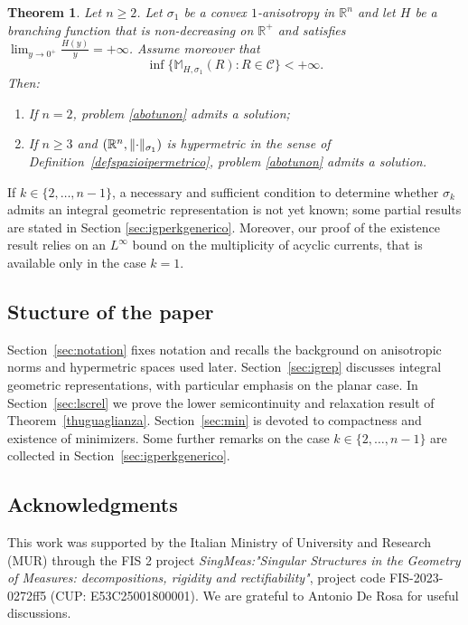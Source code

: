 \documentclass{article}
\numberwithin{equation}{section}
\theoremstyle{plain}%
\newtheorem{theorem}{Theorem}[section]
\theoremstyle{definition}
\theoremstyle{definition}
\newcommand{\rgrande}{\mathbb{R}}
\newcommand{\massaanisotropauno}{\mathbb{M}_{H,\sigma_1}}
\DeclarePairedDelimiter{\norma}{\lVert}{\rVert} %
\begin{document}
\begin{theorem}\label{thtoa}
    Let $n \geq 2$. Let $\sigma_1$ be a convex $1$-anisotropy in $\rgrande^{n}$ and let $H$ be a branching function that is non-decreasing on $\rgrande^+$ and satisfies $\lim_{y \to 0^+} \frac{H(y)}{y} = + \infty$. Assume moreover that
    $$
    \inf \{ \massaanisotropauno(R) : R \in \mathcal{C} \} < +\infty.
    $$
    Then:
    \begin{enumerate}
        \item If $n=2$, problem \eqref{abotunon} admits a solution;
        \item If $n \geq 3$ and $(\rgrande^n, \norma{\cdot}_{\sigma_1})$ is hypermetric in the sense of Definition~\ref{defspazioipermetrico}, problem \eqref{abotunon} admits a solution.
    \end{enumerate}
\end{theorem}

If $k \in \{ 2, \ldots, n-1 \}$, a necessary and sufficient condition to determine whether $\sigma_k$ admits an integral geometric representation is not yet known; some partial results are stated in Section \ref{sec:igperkgenerico}. Moreover, our proof of the existence result relies on an $L^{\infty}$ bound on the multiplicity of acyclic currents, that is available only in the case $k=1$.

\subsection{Stucture of the paper}

Section~\ref{sec:notation} fixes notation and recalls the background on anisotropic norms and hypermetric spaces used later. Section~\ref{sec:igrep} discusses integral geometric representations, with particular emphasis on the planar case. In Section~\ref{sec:lscrel} we prove the lower semicontinuity and relaxation result of Theorem~\ref{thuguaglianza}. Section~\ref{sec:min} is devoted to compactness and existence of minimizers. Some further remarks on the case $k\in\{2,\ldots,n-1\}$ are collected in Section~\ref{sec:igperkgenerico}.

\subsection*{Acknowledgments}

This work was supported by the Italian Ministry of University and Research (MUR) through the FIS 2 project \textit{SingMeas:"Singular Structures in the Geometry of Measures: decompositions, rigidity and rectifiability"}, project code FIS-2023-0272ff5 (CUP: E53C25001800001). We are grateful to Antonio De Rosa for useful discussions.
\end{document}

